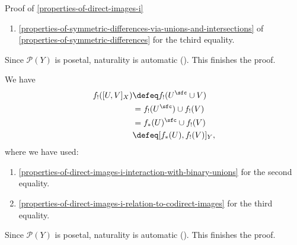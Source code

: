 \begin{Proof}{Proof of \cref{properties-of-direct-images-i}}
\begin{enumerate}
        \item\label{proof-of-properties-of-direct-images-i-interaction-with-symmetric-differences-of-5}\cref{properties-of-symmetric-differences-via-unions-and-intersections} of \cref{properties-of-symmetric-differences} for the tchird equality.
    \end{enumerate}
    Since $\mathcal{P}(Y)$ is posetal, naturality is automatic (). This finishes the proof.

    We have
    \begin{align*}
        f_{!}([U,V]_{X}) &\defeq f_{!}(U^{\sfc}\cup V)\\
                         &=      f_{!}(U^{\sfc})\cup f_{!}(V)\\
                         &=      f_{*}(U)^{\sfc}\cup f_{!}(V)\\
                         &\defeq [f_{*}(U),f_{!}(V)]_{Y},%
    \end{align*}
    where we have used:
    \begin{enumerate}
        \item\label{proof-of-properties-of-direct-images-i-interaction-with-internal-homs-of-powersets-1}\cref{properties-of-direct-images-i-interaction-with-binary-unions} for the second equality.
        \item\label{proof-of-properties-of-direct-images-i-interaction-with-internal-homs-of-powersets-2}\cref{properties-of-direct-images-i-relation-to-codirect-images} for the third equality.
    \end{enumerate}
    Since $\mathcal{P}(Y)$ is posetal, naturality is automatic (). This finishes the proof.


\end{Proof}
